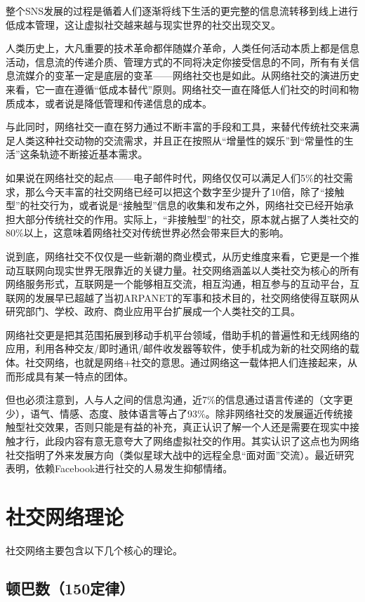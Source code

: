 \documentclass[12pt]{report}
\begin{document}
		整个SNS发展的过程是循着人们逐渐将线下生活的更完整的信息流转移到线上进行低成本管理，这让虚拟社交越来越与现实世界的社交出现交叉。
		
		人类历史上，大凡重要的技术革命都伴随媒介革命，人类任何活动本质上都是信息活动，信息流的传递介质、管理方式的不同将决定你接受信息的不同，所有有关信息流媒介的变革一定是底层的变革——网络社交也是如此。从网络社交的演进历史来看，它一直在遵循“低成本替代”原则。网络社交一直在降低人们社交的时间和物质成本，或者说是降低管理和传递信息的成本。
		
		与此同时，网络社交一直在努力通过不断丰富的手段和工具，来替代传统社交来满足人类这种社交动物的交流需求，并且正在按照从“增量性的娱乐”到“常量性的生活”这条轨迹不断接近基本需求。
		
		如果说在网络社交的起点——电子邮件时代，网络仅仅可以满足人们5\%的社交需求，那么今天丰富的社交网络已经可以把这个数字至少提升了10倍，除了“接触型”的社交行为，或者说是“接触型”信息的收集和发布之外，网络社交已经开始承担大部分传统社交的作用。实际上，“非接触型”的社交，原本就占据了人类社交的80\%以上，这意味着网络社交对传统世界必然会带来巨大的影响。
		
		说到底，网络社交不仅仅是一些新潮的商业模式，从历史维度来看，它更是一个推动互联网向现实世界无限靠近的关键力量。社交网络涵盖以人类社交为核心的所有网络服务形式，互联网是一个能够相互交流，相互沟通，相互参与的互动平台，互联网的发展早已超越了当初ARPANET的军事和技术目的，社交网络使得互联网从研究部门、学校、政府、商业应用平台扩展成一个人类社交的工具。
		
		网络社交更是把其范围拓展到移动手机平台领域，借助手机的普遍性和无线网络的应用，利用各种交友/即时通讯/邮件收发器等软件，使手机成为新的社交网络的载体。社交网络，也就是网络+社交的意思。通过网络这一载体把人们连接起来，从而形成具有某一特点的团体。
		
		但也必须注意到，人与人之间的信息沟通，近7\%的信息通过语言传递的（文字更少），语气、情感、态度、肢体语言等占了93\%。除非网络社交的发展逼近传统接触型社交效果，否则只能是有益的补充，真正认识了解一个人还是需要在现实中接触才行，此段内容有意无意夸大了网络虚拟社交的作用。其实认识了这点也为网络社交指明了外来发展方向（类似星球大战中的远程全息“面对面”交流）。最近研究表明，依赖Facebook进行社交的人易发生抑郁情绪。
	
	\section{社交网络理论}
		
		社交网络主要包含以下几个核心的理论。
	
		\subsection{顿巴数（150定律）}
		
\end{document}
